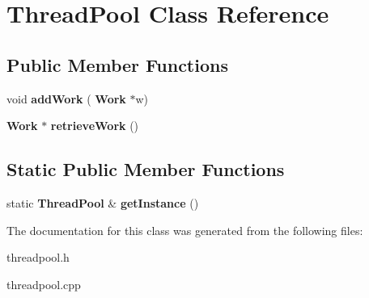 \section{Thread\+Pool Class Reference}
\label{classThreadPool}
\subsection*{Public Member Functions}
\begin{DoxyCompactItemize}
\item 
\mbox{\label{classThreadPool_ac3665f1b8b83ac3303bc62db419525ce}} 
void {\bfseries add\+Work} (\textbf{ Work} $\ast$w)
\item 
\mbox{\label{classThreadPool_ab923dc65f3def45b74f898c3e941df8d}} 
\textbf{ Work} $\ast$ {\bfseries retrieve\+Work} ()
\end{DoxyCompactItemize}
\subsection*{Static Public Member Functions}
\begin{DoxyCompactItemize}
\item 
\mbox{\label{classThreadPool_ad5fa420250f1f822902b716b8935cbdf}} 
static \textbf{ Thread\+Pool} \& {\bfseries get\+Instance} ()
\end{DoxyCompactItemize}


The documentation for this class was generated from the following files\+:\begin{DoxyCompactItemize}
\item 
threadpool.\+h\item 
threadpool.\+cpp\end{DoxyCompactItemize}
